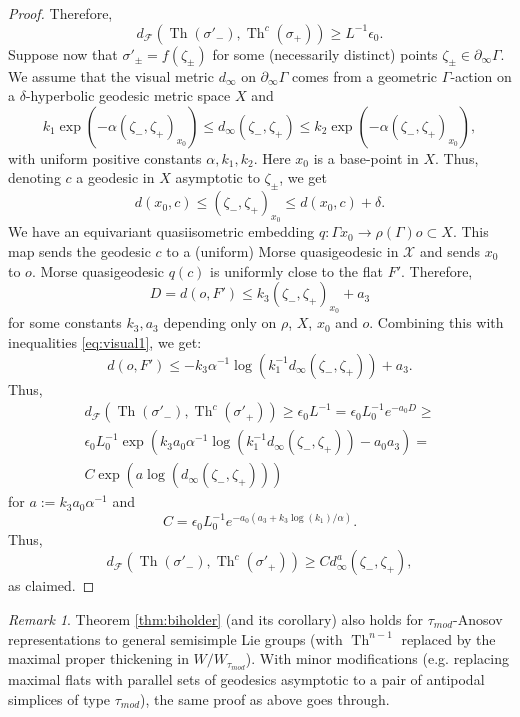 \documentclass[12pt]{amsbook}%
\theoremstyle{definition}
\theoremstyle{remark}
\newtheorem{rem}[thm]{Remark}
\numberwithin{section}{chapter}
\numberwithin{subsection}{section}
\numberwithin{figure}{chapter}
\DeclareMathOperator{\Th}{Th}
\def\eps{\epsilon}
\def\taumod{\tau_{mod}}
\def\cF{{\mathscr{F}}}
\def\cX{{\mathscr{X}}}
\def\Ga{\Gamma}
\def\geo{\partial_\infty}
\begin{document}
{{\begin{proof}
Therefore, 
$$
d_\cF(\Th(\sigma'_-), \Th^c(\sigma_+))\geqslant L^{-1}\eps_0. 
$$
Suppose now that $\sigma'_\pm=f(\zeta_\pm)$ for some (necessarily distinct) points $\zeta_\pm\in \geo \Ga$. We assume that the visual metric $d_\infty$ on $\geo \Ga$ comes from a geometric $\Ga$-action on a $\delta$-hyperbolic geodesic metric space $X$ and 
\begin{equation}\label{eq:visual1} 
k_1\exp(-\alpha (\zeta_-,\zeta_+)_{x_0})\leqslant d_{\infty}(\zeta_-,\zeta_+)\leqslant k_2\exp(-\alpha (\zeta_-,\zeta_+)_{x_0}),
\end{equation}
with uniform positive constants $\alpha, k_1, k_2$. Here $x_0$ is  a base-point in $X$. Thus, denoting $c$ a geodesic in $X$ asymptotic to 
$\zeta_\pm$, we get
$$
d(x_0,c) \leqslant  (\zeta_-,\zeta_+)_{x_0}\leqslant  d(x_0, c)+\delta. 
$$
We have an equivariant quasiisometric embedding $q: \Ga x_0\to \rho(\Ga)o\subset X$.  This map sends the geodesic $c$ to a (uniform) Morse quasigeodesic in $\cX$ and sends $x_0$ to $o$. Morse quasigeodesic $q(c)$ is uniformly close to the flat $F'$. Therefore, 
$$
D=d(o, F')\leqslant  k_3 (\zeta_-,\zeta_+)_{x_0} + a_3 
$$ 
for some constants $k_3, a_3$ depending only on $\rho$, $X$, $x_0$ and $o$. Combining this with inequalities \eqref{eq:visual1}, we get:
$$
d(o, F')\leqslant  - k_3 \alpha^{-1} \log (k_1^{-1} d_{\infty}(\zeta_-,\zeta_+)) + a_3. 
$$ 
Thus,
\begin{align*}
d_\cF(\Th(\sigma'_-), \Th^c(\sigma'_+))\geqslant \eps_0 L^{-1}= \eps_0 L^{-1}_0 e^{-a_0 D}\geqslant \\ 
\eps_0 L^{-1}_0 \exp\left(k_3 a_0\alpha^{-1} \log (k_1^{-1} d_{\infty}(\zeta_-,\zeta_+)) - a_0a_3\right)= \\
C \exp(a \log (d_{\infty}(\zeta_-,\zeta_+)) ) 
\end{align*}
for $a:= k_3 a_0 \alpha^{-1}$ and 
$$
C= \eps_0 L^{-1}_0 e^{-a_0(a_3+ k_3\log(k_1)/\alpha)}. 
$$
  Thus,
$$
d_\cF(\Th(\sigma'_-), \Th^c(\sigma'_+))\geqslant C d^a_{\infty}(\zeta_-,\zeta_+),
$$
as claimed. \end{proof}


\begin{rem}
Theorem \ref{thm:biholder} (and its corollary) also holds for $\taumod$-Anosov representations to general semisimple Lie groups 
(with $\Th^{n-1}$ replaced by the maximal proper thickening in $W/W_{\taumod}$). With minor modifications (e.g. replacing maximal flats with parallel 
sets of geodesics asymptotic to a pair of antipodal simplices of type $\taumod$), the same proof as above goes through. 
\end{rem}

}}
\end{document}
